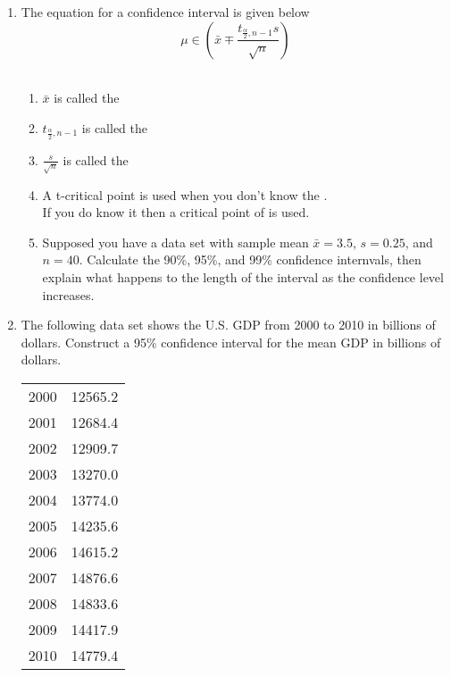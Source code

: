 \documentclass{article}
\begin{document}
\begin{enumerate}
\item The equation for a confidence interval is given below
\begin{equation*}
\mu \in \left( \bar{x} \mp \frac{t_{\frac{\alpha}{2},n-1}s}{\sqrt{n}}\right)
\end{equation*} \\
\begin{enumerate}
\item $\bar{x}$ is called the\noindent\hrulefill \\
\item $t_{\frac{\alpha}{2},n-1}$ is called the \noindent\hrulefill \\
\item $\frac{s}{\sqrt{n}}$ is called the \noindent\hrulefill \\
\item A t-critical point is used when you don't know the \noindent\hrulefill .\\ If you do know it then a critical point of \noindent\hrulefill is used.
\item Supposed you have a data set with sample mean $\bar{x} = 3.5$, $s=0.25$, and $n=40$. Calculate the 90\%, 95\%, and 99\% confidence internvals, then explain what happens to the length of the interval as the confidence level increases.
\end{enumerate}
\item The following data set shows the U.S. GDP from 2000 to 2010 in billions of dollars. Construct a 95\% confidence interval for the mean GDP in billions of dollars. 
\begin{table}[h]
    \begin{tabular}{ll}
   2000 &12565.2 \\
  2001  &12684.4 \\
   2002 &12909.7 \\
   2003 &13270.0 \\
    2004 &13774.0 \\
  2005  &14235.6 \\
   2006 &14615.2 \\
   2007 &14876.6 \\
   2008 &14833.6 \\
   2009 &14417.9 \\
   2010 &14779.4 \\
    \end{tabular}
\end{table}
\end{enumerate}
\end{document}

